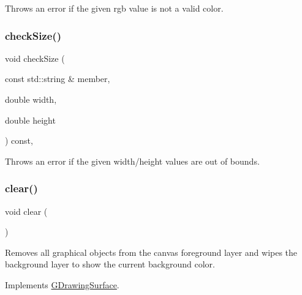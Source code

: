 Throws an error if the given rgb value is not a valid color. 

\mbox{\label{classGDrawingSurface_a70a6546707ae708573396616bd0f5320}} 
\subsubsection{\texorpdfstring{check\+Size()}{checkSize()}}
{\footnotesize\ttfamily void check\+Size (\begin{DoxyParamCaption}\item[{const std\+::string \&}]{member,  }\item[{double}]{width,  }\item[{double}]{height }\end{DoxyParamCaption}) const\hspace{0.3cm}{\ttfamily [protected]}, {\ttfamily [inherited]}}



Throws an error if the given width/height values are out of bounds. 

\mbox{\label{classGCanvas_af220cadd1499c3586d48010a0348d9f8}} 
\subsubsection{\texorpdfstring{clear()}{clear()}}
{\footnotesize\ttfamily void clear (\begin{DoxyParamCaption}{ }\end{DoxyParamCaption})\hspace{0.3cm}{\ttfamily [virtual]}}



Removes all graphical objects from the canvas foreground layer and wipes the background layer to show the current background color. 



Implements \mbox{\hyperlink{classGDrawingSurface_a5eeb94d22b8366d1b68d0614384802fe}{G\+Drawing\+Surface}}.

\mbox{\label{classGObservable_a80cfa040459ff53594adbd6a51ec8f43}} 

